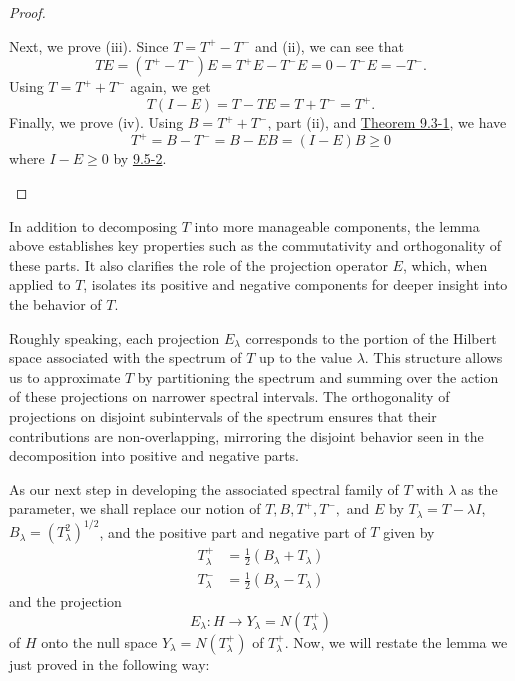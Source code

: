 \begin{proof}
\begin{enumerate}
            Next, we prove (iii). Since \( T = T^{+ } - T^{-} \) and (ii), we can see that   
            \[  TE = (T^{+} - T^{-}) E = T^{+}E - T^{-}E = 0 - T^{-} E = -T^{-}.   \]
            Using \( T=  T^{+ } + T^{-} \) again, we get
            \[  T(I - E ) = T - T E = T + T^{-} = T^{+}. \]
            Finally, we prove (iv). Using \( B = T^{+ } + T^{-} \), part (ii), and {\hyperref[9.3-1]{Theorem 9.3-1}}, we have  
            \[  T^{+} = B - T^{-} = B - EB = (I - E) B \geq 0  \]
            where \( I - E \geq 0  \) by {\hyperref[9.5-2]{9.5-2}}.
\end{enumerate}
\end{proof}

In addition to decomposing \( T \) into more manageable components, the lemma above establishes key properties such as the commutativity and orthogonality of these parts. It also clarifies the role of the projection operator \( E  \), which, when applied to \( T \), isolates its positive and negative components for deeper insight into the behavior of \( T \).

Roughly speaking, each projection \( {E}_{\lambda} \) corresponds to the portion of the Hilbert space associated with the spectrum of \( T \) up to the value \( \lambda \). This structure allows us to approximate \( T \) by partitioning the spectrum and summing over the action of these projections on narrower spectral intervals. The orthogonality of projections on disjoint subintervals of the spectrum ensures that their contributions are non-overlapping, mirroring the disjoint behavior seen in the decomposition into positive and negative parts.

As our next step in developing the associated spectral family of \( T  \) with \( \lambda  \) as the parameter, we shall replace our notion of \( T, B , T^{+}, T^{-} ,   \) and \( E  \) by \( {T}_{\lambda} = T - \lambda I  \), \( {B}_{\lambda} = ({T}_{\lambda}^{2})^{1/2}  \), and the positive part and negative part of \( T  \) given by
\begin{align*}
    {T}_{\lambda}^{+} &= \frac{ 1 }{ 2 }  ({B}_{\lambda} + {T}_{\lambda}) \\
    {T}_{\lambda}^{-} &= \frac{ 1 }{ 2 }  ({B}_{\lambda} - {T}_{\lambda})
\end{align*}
and the projection
\[  {E}_{\lambda} : H \to {Y}_{\lambda} = N({T}_{\lambda}^{+}) \]
of \( H \) onto the null space \( {Y}_{\lambda} = N({T}_{\lambda}^{+}) \) of \( {T}_{\lambda}^{+} \). Now, we will restate the lemma we just proved in the following way: 

